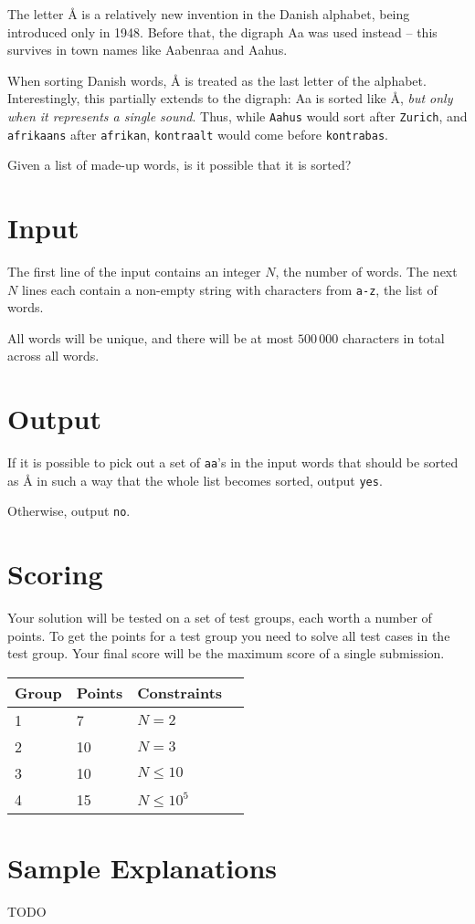 The letter Å is a relatively new invention in the Danish alphabet, being introduced only in 1948.
Before that, the digraph Aa was used instead -- this survives in town names like Aabenraa and Aahus.

When sorting Danish words, Å is treated as the last letter of the alphabet.
Interestingly, this partially extends to the digraph: Aa is sorted like Å,
\emph{but only when it represents a single sound}.
Thus, while \texttt{Aahus} would sort after \texttt{Zurich},
and \texttt{afrikaans} after \texttt{afrikan},
\texttt{kontraalt} would come before \texttt{kontrabas}.

Given a list of made-up words, is it possible that it is sorted?

\section*{Input}
The first line of the input contains an integer $N$, the number of words.
The next $N$ lines each contain a non-empty string with characters from \texttt{a-z}, the list of words.

All words will be unique, and there will be at most $500\,000$ characters in total across all words.

\section*{Output}
If it is possible to pick out a set of \texttt{aa}'s in the input words that
should be sorted as Å in such a way that the whole list becomes sorted, output \texttt{yes}.

Otherwise, output \texttt{no}.

\section*{Scoring}
Your solution will be tested on a set of test groups, each worth a number of points.
To get the points for a test group you need to solve all test cases in the test group.
Your final score will be the maximum score of a single submission.

\noindent
\begin{tabular}{| l | l | l | l |}
\hline
Group & Points & Constraints \\ \hline
1     & 7      & $N = 2$ \\ \hline
2     & 10     & $N = 3$ \\ \hline
3     & 10     & $N \le 10$ \\ \hline
4     & 15     & $N \le 10^5$ \\ \hline
\end{tabular}

\section*{Sample Explanations}
TODO
